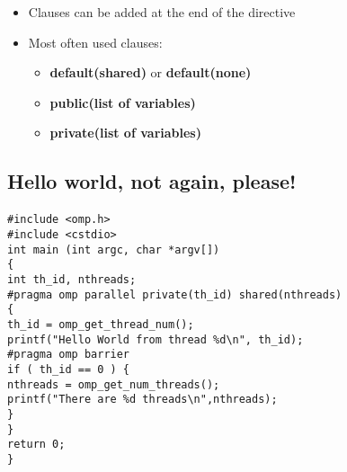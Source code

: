 \documentclass[%
oneside,                 %
final,                   %
10pt]{article}
\begin{document}
\begin{itemize}
\item Clauses can be added at the end of the directive

\item Most often used clauses:
\begin{itemize}

 \item \textbf{default(shared)} or \textbf{default(none)}

 \item \textbf{public(list of variables)}

 \item \textbf{private(list of variables)}
\end{itemize}

\noindent
\end{itemize}

\noindent



\subsection*{Hello world, not again, please!}

\paragraph{}


















\begin{verbatim}
#include <omp.h>
#include <cstdio>
int main (int argc, char *argv[])
{
int th_id, nthreads;
#pragma omp parallel private(th_id) shared(nthreads)
{
th_id = omp_get_thread_num();
printf("Hello World from thread %d\n", th_id);
#pragma omp barrier
if ( th_id == 0 ) {
nthreads = omp_get_num_threads();
printf("There are %d threads\n",nthreads);
}
}
return 0;
}

\end{verbatim}



\end{document}
